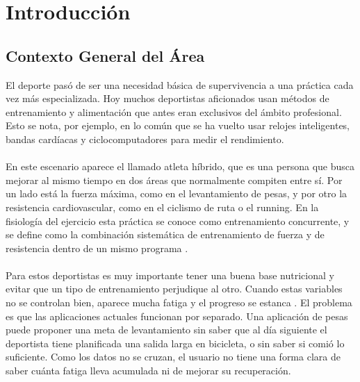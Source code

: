 \section{Introducción}
\subsection{Contexto General del Área}
El deporte pasó de ser una necesidad básica de supervivencia a una práctica cada vez más especializada. Hoy muchos deportistas aficionados usan métodos de entrenamiento y alimentación que antes eran exclusivos del ámbito profesional. Esto se nota, por ejemplo, en lo común que se ha vuelto usar relojes inteligentes, bandas cardíacas y ciclocomputadores para medir el rendimiento.
\\\\
En este escenario aparece el llamado atleta híbrido, que es una persona que busca mejorar al mismo tiempo en dos áreas que normalmente compiten entre sí. Por un lado está la fuerza máxima, como en el levantamiento de pesas, y por otro la resistencia cardiovascular, como en el ciclismo de ruta o el running. En la fisiología del ejercicio esta práctica se conoce como entrenamiento concurrente, y se define como la combinación sistemática de entrenamiento de fuerza y de resistencia dentro de un mismo programa \citep{fisiologiadelejercicio}.
\\\\
Para estos deportistas es muy importante tener una buena base nutricional y evitar que un tipo de entrenamiento perjudique al otro. Cuando estas variables no se controlan bien, aparece mucha fatiga y el progreso se estanca \citep{fisiologiadelejercicio}. El problema es que las aplicaciones actuales funcionan por separado. Una aplicación de pesas puede proponer una meta de levantamiento sin saber que al día siguiente el deportista tiene planificada una salida larga en bicicleta, o sin saber si comió lo suficiente. Como los datos no se cruzan, el usuario no tiene una forma clara de saber cuánta fatiga lleva acumulada ni de mejorar su recuperación.
\newpage
